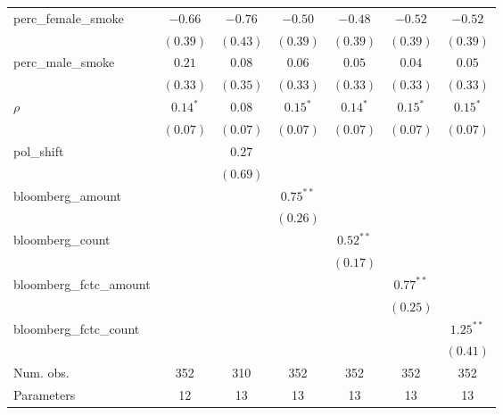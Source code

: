 \begin{table}[!h]
\begin{center}
\begin{tabular}{l c c c c c c }
perc\_female\_smoke     & $-0.66$     & $-0.76$    & $-0.50$     & $-0.48$     & $-0.52$     & $-0.52$     \\
                        & $(0.39)$    & $(0.43)$   & $(0.39)$    & $(0.39)$    & $(0.39)$    & $(0.39)$    \\
perc\_male\_smoke       & $0.21$      & $0.08$     & $0.06$      & $0.05$      & $0.04$      & $0.05$      \\
                        & $(0.33)$    & $(0.35)$   & $(0.33)$    & $(0.33)$    & $(0.33)$    & $(0.33)$    \\
$\rho$                  & $0.14^{*}$  & $0.08$     & $0.15^{*}$  & $0.14^{*}$  & $0.15^{*}$  & $0.15^{*}$  \\
                        & $(0.07)$    & $(0.07)$   & $(0.07)$    & $(0.07)$    & $(0.07)$    & $(0.07)$    \\
pol\_shift              &             & $0.27$     &             &             &             &             \\
                        &             & $(0.69)$   &             &             &             &             \\
bloomberg\_amount       &             &            & $0.75^{**}$ &             &             &             \\
                        &             &            & $(0.26)$    &             &             &             \\
bloomberg\_count        &             &            &             & $0.52^{**}$ &             &             \\
                        &             &            &             & $(0.17)$    &             &             \\
bloomberg\_fctc\_amount &             &            &             &             & $0.77^{**}$ &             \\
                        &             &            &             &             & $(0.25)$    &             \\
bloomberg\_fctc\_count  &             &            &             &             &             & $1.25^{**}$ \\
                        &             &            &             &             &             & $(0.41)$    \\
\midrule
Num. obs.               & 352         & 310        & 352         & 352         & 352         & 352         \\
Parameters              & 12          & 13         & 13          & 13          & 13          & 13          \\

\end{tabular}
\end{center}
\end{table}
